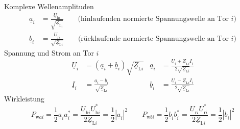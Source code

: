 \documentclass[10pt,a4paper,fleqn,landscape]{article}
\renewcommand{\c}[1]{\underline{#1}}			%
\begin{document}
\begin{multicols}{2}
Komplexe Wellenamplituden
	\begin{align*}
		\c{a}_i&=\frac{\c{U}_{\text{h}i}}{\sqrt{\c{Z}_{\text{L}_i}}} \qquad \text{(hinlaufenden normierte Spannungswelle an Tor $i$)}\\
		\c{b}_i&=\frac{\c{U}_{\text{r}i}}{\sqrt{\c{Z}_{\text{L}i}}} \qquad \text{(rücklaufende normierte Spannungswelle an Tor $i$)}
	\end{align*}
Spannung und Strom an Tor $i$
	\begin{align*}
		\c{U}_i&=(\c{a}_i+\c{b}_i)\sqrt{\c{Z}_{\text{L}i}} & \c{a}_i&=\frac{\c{U}_i+\c{Z}_{\text{L}i}\c{I}_i}{2\sqrt{\c{Z}_{\text{L}i}}} \\
		\c{I}_i&=\frac{\c{a}_i-\c{b}_i}{\sqrt{\c{Z}_{\text{L}i}}} & \c{b}_i&=\frac{\c{U}_i-\c{Z}_{\text{L}i}I_i}{2\sqrt{\c{Z}_{\text{L}i}}}
	\end{align*}
Wirkleistung
	\begin{equation*}
		P_{\text{w}ai}=\frac{1}{2}\c{a}_i\c{a}_i^*=\frac{\c{U}_{\text{h}i}\c{U}_{\text{h}i}^*}{2\c{Z}_{\text{L}i}}=\frac{1}{2}|\c{a}_i|^2 \qquad P_{\text{w}bi}=\frac{1}{2}\c{b}_i\c{b}_i^*=\frac{\c{U}_{\text{r}i}\c{U}_{\text{r}i}^*}{2\c{Z}_{\text{L}i}}=\frac{1}{2}|\c{b}_i|^2
	\end{equation*}

\end{multicols}
\end{document}
